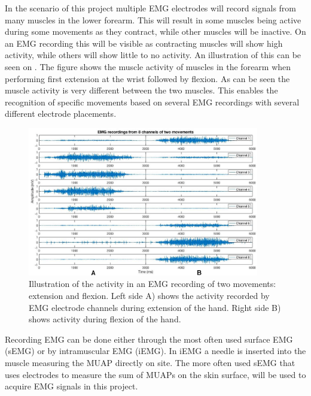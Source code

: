 In the scenario of this project multiple EMG electrodes will record signals from many muscles in the lower forearm. This will result in some muscles being active during some movements as they contract, while other muscles will be inactive. On an EMG recording this will be visible as contracting muscles will show high activity, while others will show little to no activity. An illustration of this can be seen on . The figure shows the muscle activity of muscles in the forearm when performing first extension at the wrist followed by flexion. As can be seen the muscle activity is very different between the two muscles. This enables the recognition of specific movements based on several EMG recordings with several different electrode placements. 

\begin{figure}[H] 
	\includegraphics[width=0.9\textwidth]{figures/xBackground/EMGactivityExtensionFlexion}
	\caption{Illustration of the activity in an EMG recording of two movements: extension and flexion. Left side A) shows the activity recorded by EMG electrode channels during extension of the hand. Right side B) shows activity during flexion of the hand.}
	\label{fig:EMGactivityExtensionFlexion}
\end{figure}


Recording EMG can be done either through the most often used surface EMG (sEMG) or by intramuscular EMG (iEMG). In iEMG a needle is inserted into the muscle measuring the MUAP directly on site. The more often used sEMG that uses electrodes to measure the sum of MUAPs on the skin surface, will be used to acquire EMG signals in this project. \cite{Cram2012}
